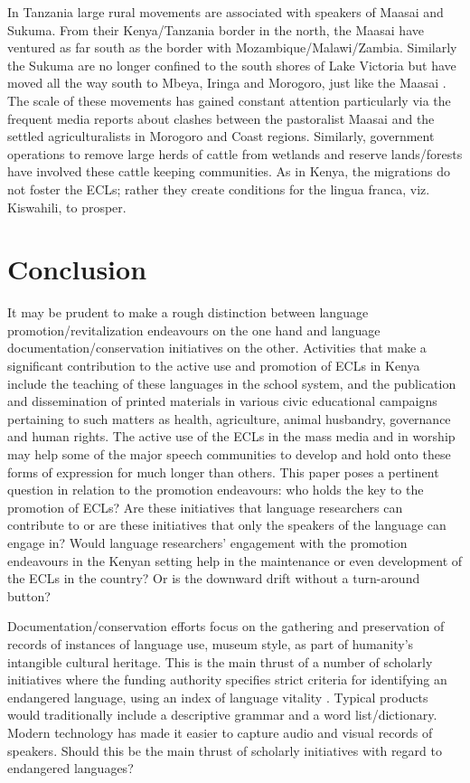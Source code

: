 \documentclass[output=paper,colorlinks,citecolor=brown]{langscibook}
\begin{document}
In Tanzania large rural movements are associated with speakers of Maasai and Sukuma. From their Kenya\slash Tanzania border in the north, the Maasai have ventured as far south as the border with Mozambique\slash Malawi\slash Zambia. Similarly the Sukuma are no longer confined to the south shores of Lake Victoria but have moved all the way south to Mbeya, Iringa and Morogoro, just like the Maasai \citep{MuzaleRugemalira2008}. The scale of these movements has gained constant attention particularly via the frequent media reports about clashes between the pastoralist Maasai and the settled agriculturalists in Morogoro and Coast regions. Similarly, government operations to remove large herds of cattle from wetlands and reserve lands\slash forests have involved these cattle keeping communities. As in Kenya, the migrations do not foster the ECLs; rather they create conditions for the lingua franca, viz. Kiswahili, to prosper.

\section{Conclusion}\label{sec:kioko:7}
\begin{sloppypar}
It may be prudent to make a rough distinction between language promotion\slash revitalization endeavours on the one hand and language documentation\slash conservation initiatives on the other.  Activities that make a significant contribution to the active use and promotion of ECLs in Kenya include the teaching of these languages in the school system, and the publication and dissemination of printed materials in various civic educational campaigns pertaining to such matters as health, agriculture, animal husbandry, governance and human rights. The active use of the ECLs in the mass media and in worship may help some of the major speech communities to develop and hold onto these forms of expression for much longer than others.  This paper poses a pertinent question in relation to the promotion endeavours:  who holds the key to the promotion of ECLs? Are these initiatives that language researchers can contribute to or are these initiatives that only the speakers of the language can engage in? Would language researchers’ engagement with the promotion endeavours in the Kenyan setting help in the maintenance or even development of the ECLs in the country? Or is the downward drift without a turn-around button?
\end{sloppypar}

Documentation\slash conservation efforts focus on the gathering and preservation of records of instances of language use, museum style, as part of humanity’s intangible cultural heritage. This is the main thrust of a number of scholarly initiatives where the funding authority specifies strict criteria for identifying an endangered language, using an index of language vitality \citep{UNESCO2003}. Typical products would traditionally include a descriptive grammar and a word list\slash dictionary. Modern technology has made it easier to capture audio and visual records of speakers. Should this be the main thrust of scholarly initiatives with regard to endangered languages?
\end{document}
